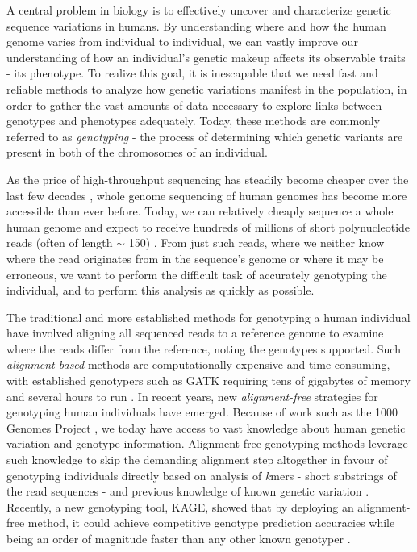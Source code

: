 A central problem in biology is to effectively uncover and characterize genetic sequence variations in humans.
By understanding where and how the human genome varies from individual to individual, we can vastly improve our understanding of how an individual's genetic makeup affects its observable traits - its phenotype.
To realize this goal, it is inescapable that we need fast and reliable methods to analyze how genetic variations manifest in the population, in order to gather the vast amounts of data necessary to explore links between genotypes and phenotypes adequately.
Today, these methods are commonly referred to as \textit{genotyping} - the process of determining which genetic variants are present in both of the chromosomes of an individual.

As the price of high-throughput sequencing has steadily become cheaper over the last few decades \cite{nhgri_sequencing_cost}, whole genome sequencing of human genomes has become more accessible than ever before.
Today, we can relatively cheaply sequence a whole human genome and expect to receive hundreds of millions of short polynucleotide reads (often of length $\sim$ 150) \cite{illumina_read_length}.
From just such reads, where we neither know where the read originates from in the sequence's genome or where it may be erroneous, we want to perform the difficult task of accurately genotyping the individual, and to perform this analysis as quickly as possible.

The traditional and more established methods for genotyping a human individual have involved aligning all sequenced reads to a reference genome to examine where the reads differ from the reference, noting the genotypes supported.
Such \textit{alignment-based} methods are computationally expensive and time consuming, with established genotypers such as GATK \cite{gatk} requiring tens of gigabytes of memory and several hours to run \cite{kage}.
In recent years, new \textit{alignment-free} strategies for genotyping human individuals have emerged.
Because of work such as the 1000 Genomes Project \cite{1000_genomes_project}, we today have access to vast knowledge about human genetic variation and genotype information.
Alignment-free genotyping methods leverage such knowledge to skip the demanding alignment step altogether in favour of genotyping individuals directly based on analysis of \textit{k}mers - short substrings of the read sequences - and previous knowledge of known genetic variation \cite{kage,malva}.
Recently, a new genotyping tool, KAGE, showed that by deploying an alignment-free method, it could achieve competitive genotype prediction accuracies while being an order of magnitude faster than any other known genotyper \cite{kage}.

